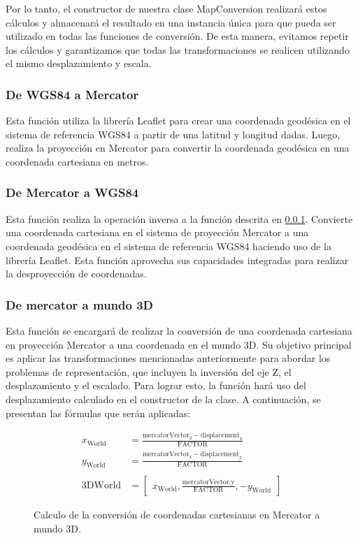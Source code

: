 \documentclass[a4paper, 11pt]{book}
\begin{document}
Por lo tanto, el constructor de nuestra clase MapConversion realizará estos cálculos y almacenará el resultado en una instancia única para que pueda ser utilizado en todas las funciones de conversión. De esta manera, evitamos repetir los cálculos y garantizamos que todas las transformaciones se realicen utilizando el mismo desplazamiento y escala.
\subsubsection{De WGS84 a Mercator}
\label{funcion:deegreeToMeter}
Esta función utiliza la librería Leaflet para crear una coordenada geodésica en el sistema de referencia WGS84 a partir de una latitud y longitud dadas. Luego, realiza la proyección en Mercator para convertir la coordenada geodésica en una coordenada cartesiana en metros.
\subsubsection{De Mercator a WGS84}
\label{funcion:meterToDegree}
Esta función realiza la operación inversa a la función descrita en \ref{funcion:deegreeToMeter}. Convierte una coordenada cartesiana en el sistema de proyección Mercator a una coordenada geodésica en el sistema de referencia WGS84 haciendo uso de la librería Leaflet. Esta función aprovecha sus capacidades integradas para realizar la desproyección de coordenadas.
\subsubsection{De mercator a mundo 3D}
\label{funcion:mercatorToWorld}
Esta función se encargará de realizar la conversión de una coordenada cartesiana en proyección Mercator a una coordenada en el mundo 3D. Su objetivo principal es aplicar las transformaciones mencionadas anteriormente para abordar los problemas de representación, que incluyen la inversión del eje Z, el desplazamiento y el escalado. Para lograr esto, la función hará uso del desplazamiento calculado en el constructor de la clase. A continuación, se presentan las fórmulas que serán aplicadas:

\begin{figure}[H]
    \begin{align*}
    x_{\text{World}} &= \frac{\mathbf{\mathrm{mercatorVector}}_{\text{x}} - \mathbf{\mathrm{displacement}}_{\text{x}}}{\mathbf{\mathrm{FACTOR}}} \\
    y_{\text{World}} &= \frac{\mathbf{\mathrm{mercatorVector}}_{\text{z}} - \mathbf{\mathrm{displacement}}_{\text{y}}}{\mathbf{\mathrm{FACTOR}}} \\\\
    \mathbf{\mathrm{3DWorld}} &= 
    \begin{bmatrix}
    x_{\text{World}}, \frac{\text{mercatorVector.y}}{\mathbf{\mathrm{FACTOR}}}, -y_{\text{World}}
    \end{bmatrix}
    \end{align*}
\caption{Calculo de la conversión de coordenadas cartesianas en Mercator a mundo 3D.}
  \label{formula:mercatorToWorld}
\end{figure}
\end{document}
